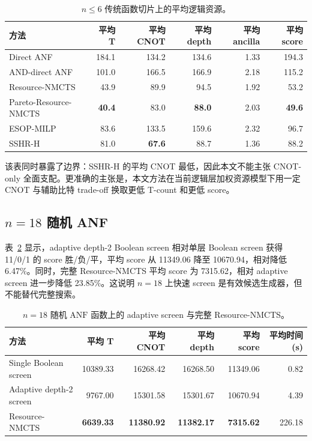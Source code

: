 \documentclass[UTF8,fontset=macnew,11pt]{ctexart}
\newcommand{\method}{Resource-NMCTS}
\newcommand{\pareto}{Pareto-Resource-NMCTS}
\newcommand{\anf}{\ensuremath{\mathrm{ANF}}}
\begin{document}
\begin{table}[t]
\centering
\small
\caption{$n\leq6$ 传统函数切片上的平均逻辑资源。}
\label{tab:traditional}
\begin{tabular}{lrrrrr}
\toprule
方法 & 平均 T & 平均 CNOT & 平均 depth & 平均 ancilla & 平均 score \\
\midrule
Direct ANF & 184.1 & 134.2 & 134.6 & 1.33 & 194.3 \\
AND-direct ANF & 101.0 & 166.5 & 166.9 & 2.18 & 115.2 \\
\method{} & 43.9 & 89.9 & 94.5 & 1.92 & 53.2 \\
\pareto{} & \textbf{40.4} & 83.0 & \textbf{88.0} & 2.03 & \textbf{49.6} \\
ESOP-MILP & 83.6 & 133.5 & 159.6 & 2.32 & 96.7 \\
SSHR-H & 81.0 & \textbf{67.6} & 88.7 & 1.36 & 88.2 \\
\bottomrule
\end{tabular}
\end{table}

该表同时暴露了边界：SSHR-H 的平均 CNOT 最低，因此本文不能主张 CNOT-only 全面支配。更准确的主张是，本文方法在当前逻辑层加权资源模型下用一定 CNOT 与辅助比特 trade-off 换取更低 T-count 和更低 score。

\subsection{\texorpdfstring{$n=18$}{n=18} 随机 ANF}

表~\ref{tab:n18} 显示，adaptive depth-2 Boolean screen 相对单层 Boolean screen 获得 11/0/1 的 score 胜/负/平，平均 score 从 11349.06 降至 10670.94，相对降低 6.47\%。同时，完整 \method{} 平均 score 为 7315.62，相对 adaptive screen 进一步降低 23.85\%。这说明 $n=18$ 上快速 screen 是有效候选生成器，但不能替代完整搜索。

\begin{table}[t]
\centering
\small
\caption{$n=18$ 随机 \anf{} 函数上的 adaptive screen 与完整 \method{}。}
\label{tab:n18}
\begin{tabular}{lrrrrr}
\toprule
方法 & 平均 T & 平均 CNOT & 平均 depth & 平均 score & 平均时间(s) \\
\midrule
Single Boolean screen & 10389.33 & 16268.42 & 16268.50 & 11349.06 & 0.82 \\
Adaptive depth-2 screen & 9767.00 & 15301.58 & 15301.67 & 10670.94 & 4.39 \\
\method{} & \textbf{6639.33} & \textbf{11380.92} & \textbf{11382.17} & \textbf{7315.62} & 226.18 \\
\bottomrule
\end{tabular}
\end{table}
\end{document}
